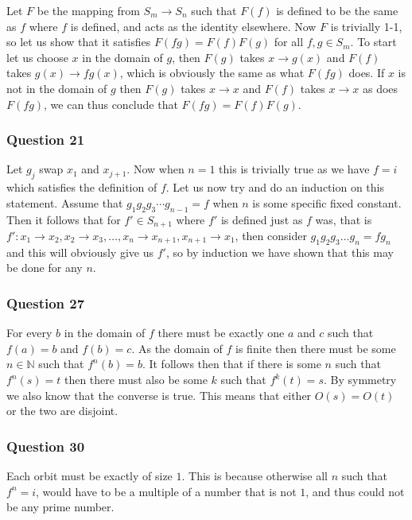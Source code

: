 \documentclass{article}
\begin{document}
Let $F$ be the mapping from $S_m\to S_n$ such that $F(f)$ is defined to be the same as $f$ where $f$ is defined, and acts as the identity elsewhere. Now $F$ is trivially 1-1, so let us show that it satisfies $F(fg) = F(f)F(g)$ for all $f,g \in S_m$. To start let us choose $x$ in the domain of $g$, then $F(g)$ takes $x \to g(x)$ and $F(f)$ takes $g(x) \to fg(x)$, which is obviously the same as what $F(fg)$ does. If $x$ is not in the domain of $g$ then $F(g)$ takes $x\to x$ and $F(f)$ takes $x \to x$ as does $F(fg)$, we can thus conclude that $F(fg) = F(f)F(g)$.

\subsubsection{Question 21}

Let $g_j$ swap $x_1$ and $x_{j+1}$. Now when $n = 1$ this is trivially true as we have $f = i$ which satisfies the definition of $f$. Let us now try and do an induction on this statement. Assume that $g_1g_2g_3\cdots g_{n-1} = f$ when $n$ is some specific fixed constant. Then it follows that for $f'\in S_{n+1}$ where $f'$ is defined just as $f$ was, that is $f': x_1\to x_2, x_2 \to x_3, \ldots, x_n \to x_{n+1}, x_{n+1} \to x_1$, then consider $g_1g_2g_3 \ldots g_n = fg_n$ and this will obviously give us $f'$, so by induction we have shown that this may be done for any $n$.


\subsubsection{Question 27}
For every $b$ in the domain of $f$ there must be exactly one $a$ and $c$ such that $f(a) = b$ and $f(b) = c$. As the domain of $f$ is finite then there must be some $n\in\mathbb N$ such that $f^n(b) = b$. It follows then that if there is some $n$ such that $f^n(s) = t$ then there must also be some $k$ such that $f^k(t) = s$. By symmetry we also know that the converse is true. This means that either $O(s) = O(t)$ or the two are disjoint.

\subsubsection{Question 30}
Each orbit must be exactly of size $1$. This is because otherwise all $n$ such that $f^n = i$, would have to be a multiple of a number that is not $1$, and thus could not be any prime number.
\end{document}
